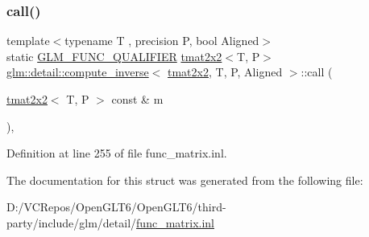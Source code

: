 \subsubsection{\texorpdfstring{call()}{call()}}
{\footnotesize\ttfamily template$<$typename T , precision P, bool Aligned$>$ \\
static \mbox{\hyperlink{setup_8hpp_a33fdea6f91c5f834105f7415e2a64407}{G\+L\+M\+\_\+\+F\+U\+N\+C\+\_\+\+Q\+U\+A\+L\+I\+F\+I\+ER}} \mbox{\hyperlink{structglm_1_1tmat2x2}{tmat2x2}}$<$T, P$>$ \mbox{\hyperlink{structglm_1_1detail_1_1compute__inverse}{glm\+::detail\+::compute\+\_\+inverse}}$<$ \mbox{\hyperlink{structglm_1_1tmat2x2}{tmat2x2}}, T, P, Aligned $>$\+::call (\begin{DoxyParamCaption}\item[{\mbox{\hyperlink{structglm_1_1tmat2x2}{tmat2x2}}$<$ T, P $>$ const \&}]{m }\end{DoxyParamCaption})\hspace{0.3cm}{\ttfamily [inline]}, {\ttfamily [static]}}



Definition at line 255 of file func\+\_\+matrix.\+inl.



The documentation for this struct was generated from the following file\+:\begin{DoxyCompactItemize}
\item 
D\+:/\+V\+C\+Repos/\+Open\+G\+L\+T6/\+Open\+G\+L\+T6/third-\/party/include/glm/detail/\mbox{\hyperlink{func__matrix_8inl}{func\+\_\+matrix.\+inl}}\end{DoxyCompactItemize}
